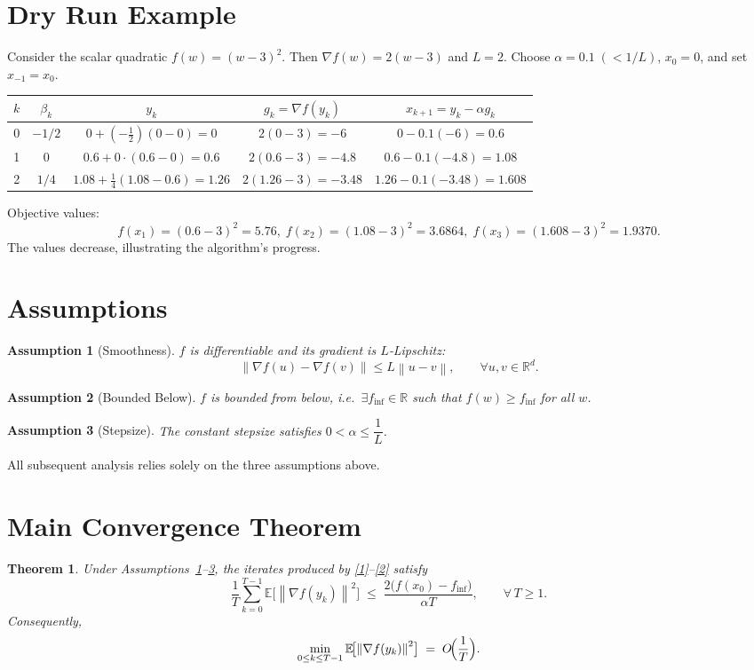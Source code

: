 \documentclass[11pt]{article}
\newtheorem{theorem}{Theorem}
\newtheorem{assumption}{Assumption}
\newcommand{\E}{\mathbb{E}}
\newcommand{\norm}[1]{\left\|#1\right\|}
\newcommand{\grad}{\nabla}
\begin{document}
\section*{Dry Run Example}
Consider the scalar quadratic $f(w)=(w-3)^2$.
Then $\grad f(w)=2(w-3)$ and $L=2$.
Choose $\alpha=0.1\;( <1/L)$, $x_0=0$, and set $x_{-1}=x_0$.

\begin{center}
\begin{tabular}{c|c|c|c|c}
$k$ & $\beta_k$ & $y_k$ & $g_k=\grad f(y_k)$ & $x_{k+1}=y_k-\alpha g_k$\\ \hline
0 & $-1/2$ & $0+(-\tfrac12)(0-0)=0$ & $2(0-3)=-6$ & $0-0.1(-6)=0.6$ \\[4pt]
1 & $0$   & $0.6+0\cdot(0.6-0)=0.6$ & $2(0.6-3)=-4.8$ & $0.6-0.1(-4.8)=1.08$ \\[4pt]
2 & $1/4$ & $1.08+\tfrac14(1.08-0.6)=1.26$ & $2(1.26-3)=-3.48$ & $1.26-0.1(-3.48)=1.608$
\end{tabular}
\end{center}
Objective values:
\[
f(x_1)= (0.6-3)^2=5.76,\;
f(x_2)= (1.08-3)^2=3.6864,\;
f(x_3)= (1.608-3)^2=1.9370.
\]
The values decrease, illustrating the algorithm’s progress.

\newpage
\section*{Assumptions}
\begin{assumption}[Smoothness]\label{ass:smooth}
$f$ is differentiable and its gradient is $L$‑Lipschitz:
\[
\norm{\grad f(u)-\grad f(v)}\le L\norm{u-v},\qquad\forall u,v\in\mathbb{R}^d .
\]
\end{assumption}
\begin{assumption}[Bounded Below]\label{ass:lower}
$f$ is bounded from below, i.e.~$\exists f_{\inf}\in\mathbb{R}$ such that $f(w)\ge f_{\inf}$ for all $w$.
\end{assumption}
\begin{assumption}[Stepsize]\label{ass:stepsize}
The constant stepsize satisfies $0<\alpha\le \dfrac{1}{L}$.
\end{assumption}
All subsequent analysis relies solely on the three assumptions above.

\section*{Main Convergence Theorem}
\begin{theorem}\label{thm:main}
Under Assumptions~\ref{ass:smooth}–\ref{ass:stepsize}, the iterates produced by \eqref{1}–\eqref{2} satisfy
\[
\frac{1}{T}\sum_{k=0}^{T-1}\E\!\bigl[\norm{\grad f(y_k)}^{2}\bigr]
\;\le\;
\frac{2\bigl(f(x_0)-f_{\inf}\bigr)}{\alpha T},
\qquad\forall\,T\ge 1 .
\tag{3}
\]
Consequently,
\[
\min_{0\le k\le T-1}\E\!\bigl[\norm{\grad f(y_k)}^{2}\bigr]
\;=\;O\!\Bigl(\frac{1}{T}\Bigr).
\]
\end{theorem}
\end{document}
